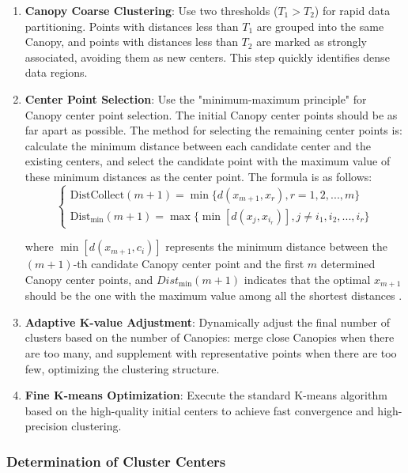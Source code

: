 \documentclass{article}
\begin{document}
	\begin{enumerate}[label=\arabic*.]
		\item \textbf{Canopy Coarse Clustering}: Use two thresholds ($T_1 > T_2$) for rapid data partitioning. Points with distances less than $T_1$ are grouped into the same Canopy, and points with distances less than $T_2$ are marked as strongly associated, avoiding them as new centers. This step quickly identifies dense data regions.
		
		\item \textbf{Center Point Selection}: Use the "minimum-maximum principle" for Canopy center point selection. The initial Canopy center points should be as far apart as possible. The method for selecting the remaining center points is: calculate the minimum distance between each candidate center and the existing centers, and select the candidate point with the maximum value of these minimum distances as the center point. The formula is as follows:
		\[
		\begin{cases} 
			\text{DistCollect}(m+1) = \min \{ d(x_{m+1}, x_r), r = 1, 2, ..., m \} \\
			\text{Dist}_{\min}(m+1) = \max \{ \min [d(x_j, x_{i_r})], j \neq i_1, i_2, ..., i_r \}
		\end{cases} \tag{1}
		\]
		
		where $\min[d(x_{m+1}, c_i)]$ represents the minimum distance between the $(m+1)$-th candidate Canopy center point and the first $m$ determined Canopy center points, and $Dist_{\min} (m+1)$ indicates that the optimal $x_{m+1}$ should be the one with the maximum value among all the shortest distances \cite{mao2012}.
		
		\item \textbf{Adaptive K-value Adjustment}: Dynamically adjust the final number of clusters based on the number of Canopies: merge close Canopies when there are too many, and supplement with representative points when there are too few, optimizing the clustering structure.
		
		\item \textbf{Fine K-means Optimization}: Execute the standard K-means algorithm based on the high-quality initial centers to achieve fast convergence and high-precision clustering.
	\end{enumerate}
	
	\subsubsection{Determination of Cluster Centers}
	
\end{document}
